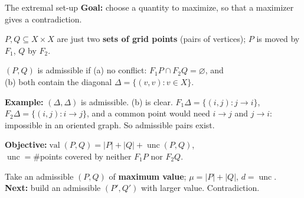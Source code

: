 \documentclass[aspectratio=169,11pt]{beamer}
\newcommand{\abs}[1]{\lvert #1\rvert}
\newcommand{\val}{\operatorname{val}}
\newcommand{\unc}{\operatorname{unc}}
\begin{document}
\begin{frame}{The extremal set-up}
\textbf{Goal:} choose a quantity to maximize, so that a maximizer gives a contradiction.

\medskip
$P,Q\subseteq X\times X$ are just two \textbf{sets of grid points} (pairs of
vertices); $P$ is moved by $F_1$, $Q$ by $F_2$.
\begin{block}{$(P,Q)$ is admissible if}
(a) no conflict: $F_1P\cap F_2Q=\varnothing$, and\\
(b) both contain the diagonal $\Delta=\{(v,v):v\in X\}$.
\end{block}
{\small\textbf{Example:} $(\Delta,\Delta)$ is admissible. (b) is clear. $F_1\Delta=\{(i,j):j\to i\}$,
$F_2\Delta=\{(i,j):i\to j\}$, and a common point would need $i\to j$ and $j\to i$:
impossible in an oriented graph. So admissible pairs exist.\par}

\medskip
\textbf{Objective:}\quad $\val(P,Q)=\abs P+\abs Q+\unc(P,Q)$,\\
$\unc=\#$points covered by neither $F_1P$ nor $F_2Q$.

\medskip
Take an admissible $(P,Q)$ of \textbf{maximum value}; $\mu=\abs P+\abs Q$, $d=\unc$.\\
\textbf{Next:} build an admissible $(P',Q')$ with larger value. Contradiction.
\end{frame}
\end{document}
